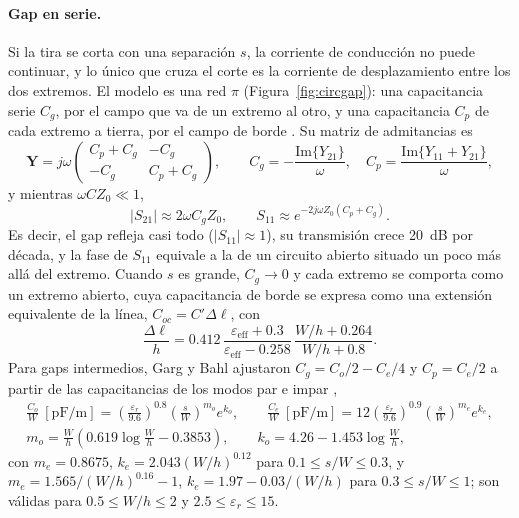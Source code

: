 \documentclass[11pt,letterpaper]{article}
\begin{document}
\paragraph{Gap en serie.} Si la tira se corta con una separación $s$, la corriente de conducción no puede continuar, y lo único que cruza el corte es la corriente de desplazamiento entre los dos extremos. El modelo es una red $\pi$ (Figura~\ref{fig:circgap}): una capacitancia serie $C_g$, por el campo que va de un extremo al otro, y una capacitancia $C_p$ de cada extremo a tierra, por el campo de borde \cite{gupta}. Su matriz de admitancias es
\begin{equation}
\mathbf{Y} = j\omega\begin{pmatrix} C_p+C_g & -C_g\\ -C_g & C_p+C_g\end{pmatrix},
\qquad
C_g = -\frac{\mathrm{Im}\{Y_{21}\}}{\omega}, \quad C_p = \frac{\mathrm{Im}\{Y_{11}+Y_{21}\}}{\omega},
\label{eq:ygap}
\end{equation}
y mientras $\omega C Z_0\ll 1$,
\begin{equation}
|S_{21}| \approx 2\omega C_g Z_0, \qquad S_{11} \approx e^{-2j\omega Z_0 (C_p+C_g)}.
\label{eq:sgap}
\end{equation}
Es decir, el gap refleja casi todo ($|S_{11}|\approx 1$), su transmisión crece 20~dB por década, y la fase de $S_{11}$ equivale a la de un circuito abierto situado un poco más allá del extremo. Cuando $s$ es grande, $C_g\to 0$ y cada extremo se comporta como un extremo abierto, cuya capacitancia de borde se expresa como una extensión equivalente de la línea, $C_{oc}=C'\Delta\ell$, con \cite{gupta}
\begin{equation}
\frac{\Delta\ell}{h} = 0.412\,\frac{\varepsilon_{\mathrm{eff}}+0.3}{\varepsilon_{\mathrm{eff}}-0.258}\,\frac{W/h+0.264}{W/h+0.8}.
\label{eq:dloc}
\end{equation}
Para gaps intermedios, Garg y Bahl ajustaron $C_g=C_o/2-C_e/4$ y $C_p=C_e/2$ a partir de las capacitancias de los modos par e impar \cite{gupta},
\begin{gather}
\frac{C_o}{W}\ [\mathrm{pF/m}] = \left(\frac{\varepsilon_r}{9.6}\right)^{0.8}\left(\frac{s}{W}\right)^{m_o} e^{k_o}, \qquad
\frac{C_e}{W}\ [\mathrm{pF/m}] = 12\left(\frac{\varepsilon_r}{9.6}\right)^{0.9}\left(\frac{s}{W}\right)^{m_e} e^{k_e}, \nonumber\\[4pt]
m_o = \frac{W}{h}\left(0.619\log\frac{W}{h}-0.3853\right), \qquad k_o = 4.26-1.453\log\frac{W}{h},
\label{eq:gargbahl}
\end{gather}
con $m_e=0.8675$, $k_e=2.043(W/h)^{0.12}$ para $0.1\leq s/W\leq 0.3$, y $m_e=1.565/(W/h)^{0.16}-1$, $k_e=1.97-0.03/(W/h)$ para $0.3\leq s/W\leq 1$; son válidas para $0.5\leq W/h\leq 2$ y $2.5\leq\varepsilon_r\leq 15$.
\end{document}
